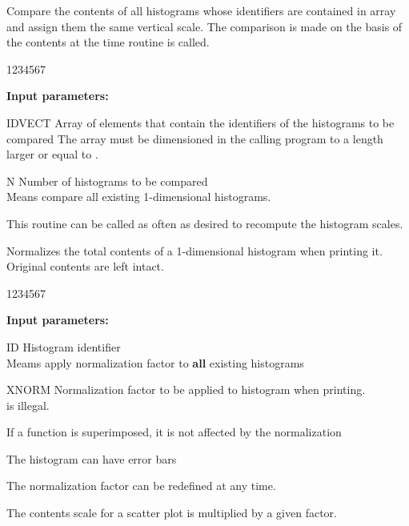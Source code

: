  
\Action
Compare the contents of all histograms whose identifiers are
contained in array  and assign them
the same vertical scale.
The comparison is made on the basis of the contents at the
time routine is called.
 
\begin{DLttc}{1234567}
\item[{\rm\bf Input parameters:}]
\item[IDVECT] Array of  elements that contain the identifiers
of the histograms to be compared
The array must be dimensioned in the calling program
to a length larger or equal to .
\item[N] Number of histograms to be compared\\
 Means compare all existing 1-dimensional histograms.
\end{DLttc}
 
\Remark
 
This routine can be called as often as desired to recompute the
histogram scales.
 
 
\Action
Normalizes the total contents of a 1-dimensional histogram
when printing it. Original contents are left intact.
 
\begin{DLttc}{1234567}
\item[{\rm\bf Input parameters:}]
\item[ID] Histogram identifier\\
 Meams apply normalization factor
to {\bf all} existing histograms
\item[XNORM] Normalization factor to be applied to histogram
when printing. \\
 is illegal.
\end{DLttc}
 
\Remarks
 
\begin{UL}
\item If a function is superimposed,
it is not affected by the normalization
\item The histogram can have error bars
\item The normalization factor can be redefined at any time.
\end{UL}
 
 
\Action
The contents scale for a scatter plot is multiplied by a given factor.
 
